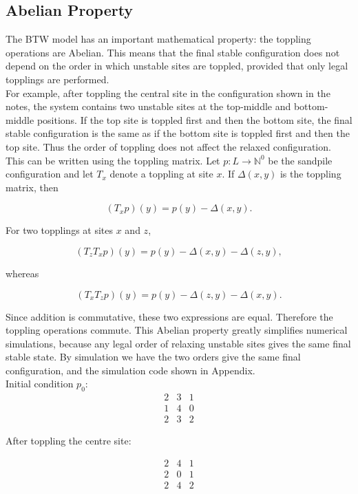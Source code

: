\documentclass{article}
\begin{document}
\clearpage

\subsection{Abelian Property}
The BTW model has an important mathematical property: the toppling operations are Abelian. This means that the final stable configuration does not depend on the order in which unstable sites are toppled, provided that only legal topplings are performed.\\

For example, after toppling the central site in the configuration shown in the notes, the system contains two unstable sites at the top-middle and bottom-middle positions. If the top site is toppled first and then the bottom site, the final stable configuration is the same as if the bottom site is toppled first and then the top site. Thus the order of toppling does not affect the relaxed configuration.\\

This can be written using the toppling matrix. Let \(p:L\to\mathbb{N}^0\) be the sandpile configuration and let \(T_x\) denote a toppling at site \(x\). If \(\Delta(x,y)\) is the toppling matrix, then

\[
(T_xp)(y)=p(y)-\Delta(x,y).
\]

For two topplings at sites \(x\) and \(z\),

\[
(T_zT_xp)(y)=p(y)-\Delta(x,y)-\Delta(z,y),
\]

whereas

\[
(T_xT_zp)(y)=p(y)-\Delta(z,y)-\Delta(x,y).
\]

Since addition is commutative, these two expressions are equal. Therefore the toppling operations commute. This Abelian property greatly simplifies numerical simulations, because any legal order of relaxing unstable sites gives the same final stable state. By simulation we have the two orders give the same final configuration, and the simulation code shown in Appendix. \\

Initial condition $p_0$:
\[
\begin{matrix} 
2 & 3 & 1 \\
1 & 4 & 0 \\
2 & 3 & 2
\end{matrix}
\]

After toppling the centre site:

\[
\begin{matrix} 
2 & 4 & 1 \\
2 & 0 & 1\\
2 & 4 & 2
\end{matrix}
\]
\end{document}
